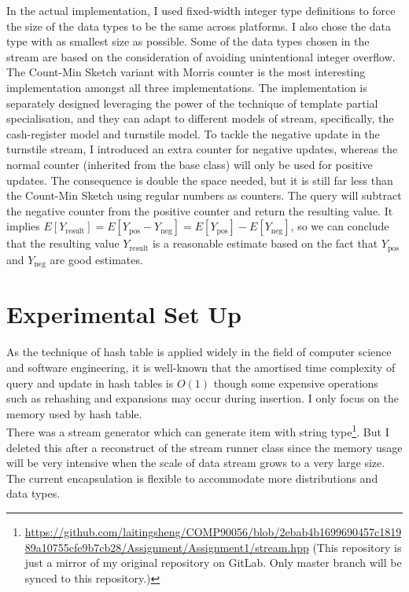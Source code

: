 \documentclass[a4paper, 11pt]{article}
\begin{document}
        \noindent In the actual implementation, I used fixed-width integer type definitions to force the size of the data types to be the same across platforms. I also chose the data type with as smallest size as possible. Some of the data types chosen in the stream are based on the consideration of avoiding unintentional integer overflow. \\

        \noindent The Count-Min Sketch variant with Morris counter is the most interesting implementation amongst all three implementations. The implementation is separately designed leveraging the power of the technique of template partial specialisation, and they can adapt to different models of stream, specifically, the cash-register model and turnstile model. To tackle the negative update in the turnstile stream, I introduced an extra counter for negative updates, whereas the normal counter (inherited from the base class) will only be used for positive updates. The consequence is double the space needed, but it is still far less than the Count-Min Sketch using regular numbers as counters. The query will subtract the negative counter from the positive counter and return the resulting value. It implies $E \left[ Y_{\text{result}} \right] = E \left[ Y_{\text{pos}} - Y_{\text{neg}} \right] = E \left[ Y_{\text{pos}} \right] - E \left[ Y_{\text{neg}} \right]$, so we can conclude that the resulting value $Y_{\text{result}}$ is a reasonable estimate based on the fact that $Y_{\text{pos}}$ and $Y_{\text{neg}}$ are good estimates.
    \section{Experimental Set Up}
        As the technique of hash table is applied widely in the field of computer science and software engineering, it is well-known that the amortised time complexity of query and update in hash tables is $O(1)$ though some expensive operations such as rehashing and expansions may occur during insertion. I only focus on the memory used by hash table. \\

        \noindent There was a stream generator which can generate item with string type\footnote{\url{https://github.com/laitingsheng/COMP90056/blob/2ebab4b1699690457c181989a10755cfe9b7cb28/Assignment/Assignment1/stream.hpp} (This repository is just a mirror of my original repository on GitLab. Only master branch will be synced to this repository.)}. But I deleted this after a reconstruct of the stream runner class since the memory usage will be very intensive when the scale of data stream grows to a very large size. The current encapsulation is flexible to accommodate more distributions and data types. \\
\end{document}
